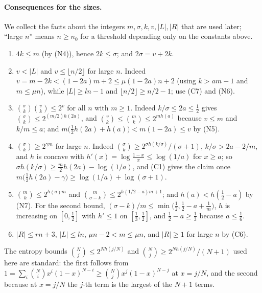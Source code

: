 \documentclass[11pt]{article}
\theoremstyle{definition}
\newcommand{\abs}[1]{\lvert #1\rvert}
\newcommand{\floor}[1]{\lfloor #1\rfloor}
\begin{document}
\paragraph{Consequences for the sizes.} We collect the facts about the integers $m,\sigma,k,v,\abs L,\abs R$ that
are used later; ``large $n$'' means $n\ge n_0$ for a threshold depending only on the constants above.
\begin{enumerate}[label=\textup{(S\arabic*)}]
\item $4k\le m$ (by \textup{(N4)}), hence $2k\le\sigma$; and $2\sigma=v+2k$.
\item $v<\abs L$ and $v\le\floor{n/2}$ for large $n$. Indeed $v=m-2k<(1-2a)m+2\le\mu(1-2a)n+2$ (using $k>am-1$
and $m\le\mu n$), while $\abs L\ge ln-1$ and
$\floor{n/2}\ge n/2-1$; use \textup{(C7)} and \textup{(N6)}.
\item $\binom\sigma k\binom vk\le2^{v}$ for all $n$ with $m\ge1$. Indeed $k/\sigma\le2a\le\tfrac12$ gives
$\binom\sigma k\le2^{(m/2)h(2a)}$, and $\binom vk\le\binom mk\le2^{mh(a)}$ because $v\le m$ and $k/m\le a$; and $m\bigl(\tfrac12h(2a)+h(a)\bigr)<m(1-2a)\le v$
by \textup{(N5)}.
\item $\binom\sigma k\ge2^{\gamma m}$ for large $n$. Indeed $\binom\sigma k\ge2^{\sigma h(k/\sigma)}/(\sigma+1)$,
$k/\sigma>2a-2/m$, and $h$ is concave with $h'(x)=\log\frac{1-x}{x}\le\log(1/a)$ for $x\ge a$; so
$\sigma h(k/\sigma)\ge\tfrac m2h(2a)-\log(1/a)$, and \textup{(C1)} gives the claim once
$m\bigl(\tfrac12h(2a)-\gamma\bigr)\ge\log(1/a)+\log(\sigma+1)$.
\item $\binom mk\le2^{h(a)m}$ and $\binom m{\sigma-k}\le2^{h(1/2-a)m+1}$; and $h(a)<h(\tfrac12-a)$ by
\textup{(N7)}. For the second bound, $(\sigma-k)/m\le\min\bigl(\tfrac12,\tfrac12-a+\tfrac1m\bigr)$, $h$ is increasing on
$[0,\tfrac12]$ with $h'\le1$ on $[\tfrac13,\tfrac12]$, and $\tfrac12-a\ge\tfrac13$ because $a\le\tfrac16$.
\item $\abs R\le rn+3$, $\abs L\le ln$, $\mu n-2<m\le\mu n$, and $\abs R\ge1$ for large $n$ by \textup{(C6)}.
\end{enumerate}
The entropy bounds $\binom Nj\le2^{Nh(j/N)}$ and $\binom Nj\ge2^{Nh(j/N)}/(N+1)$ used here are standard: the first
follows from $1=\sum_i\binom Ni x^i(1-x)^{N-i}\ge\binom Njx^j(1-x)^{N-j}$ at $x=j/N$, and the second because at
$x=j/N$ the $j$-th term is the largest of the $N+1$ terms.
\end{document}
